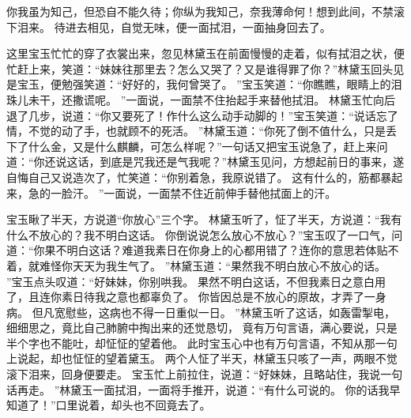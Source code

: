 你我虽为知己，但恐自不能久待；你纵为我知己，奈我薄命何！想到此间，不禁滚下泪来。
待进去相见，自觉无味，便一面拭泪，一面抽身回去了。
\par
这里宝玉忙忙的穿了衣裳出来，忽见林黛玉在前面慢慢的走着，似有拭泪之状，便忙赶上来，笑道：“妹妹往那里去？怎么又哭了？又是谁得罪了你？”林黛玉回头见是宝玉，便勉强笑道：“好好的，我何曾哭了。
”宝玉笑道：“你瞧瞧，眼睛上的泪珠儿未干，还撒谎呢。
”一面说，一面禁不住抬起手来替他拭泪。
林黛玉忙向后退了几步，说道：“你又要死了！作什么这么动手动脚的！”宝玉笑道：“说话忘了情，不觉的动了手，也就顾不的死活。
”林黛玉道：“你死了倒不值什么，只是丢下了什么金，又是什么麒麟，可怎么样呢？”一句话又把宝玉说急了，赶上来问道：“你还说这话，到底是咒我还是气我呢？”林黛玉见问，方想起前日的事来，遂自悔自己又说造次了，忙笑道：“你别着急，我原说错了。
这有什么的，筋都暴起来，急的一脸汗。
”一面说，一面禁不住近前伸手替他拭面上的汗。
\par
宝玉瞅了半天，方说道“你放心”三个字。
林黛玉听了，怔了半天，方说道：“我有什么不放心的？我不明白这话。
你倒说说怎么放心不放心？”宝玉叹了一口气，问道：“你果不明白这话？难道我素日在你身上的心都用错了？连你的意思若体贴不着，就难怪你天天为我生气了。
”林黛玉道：“果然我不明白放心不放心的话。
”宝玉点头叹道：“好妹妹，你别哄我。
果然不明白这话，不但我素日之意白用了，且连你素日待我之意也都辜负了。
你皆因总是不放心的原故，才弄了一身病。
但凡宽慰些，这病也不得一日重似一日。
”林黛玉听了这话，如轰雷掣电，细细思之，竟比自己肺腑中掏出来的还觉恳切，
竟有万句言语，满心要说，只是半个字也不能吐，却怔怔的望着他。
此时宝玉心中也有万句言语，不知从那一句上说起，却也怔怔的望着黛玉。
两个人怔了半天，林黛玉只咳了一声，两眼不觉滚下泪来，回身便要走。
宝玉忙上前拉住，说道：“好妹妹，且略站住，我说一句话再走。
”林黛玉一面拭泪，一面将手推开，说道：“有什么可说的。
你的话我早知道了！”口里说着，却头也不回竟去了。
